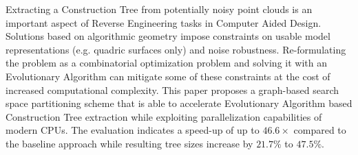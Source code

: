 Extracting a Construction Tree from potentially noisy point clouds is an important aspect of Reverse Engineering tasks in Computer Aided Design. 
Solutions based on algorithmic geometry impose constraints on usable model representations (e.g. quadric surfaces only) and noise robustness. 
Re-formulating the problem as a combinatorial optimization problem and solving it with an Evolutionary Algorithm can mitigate some of these constraints at the cost of increased computational complexity. 
This paper proposes a graph-based search space partitioning scheme that is able to accelerate Evolutionary Algorithm based Construction Tree extraction while exploiting parallelization capabilities of modern CPUs.
The evaluation indicates a speed-up of up to $46.6\times$ compared to the baseline approach while resulting tree sizes increase by $21.7\%$ to $47.5\%$. 
